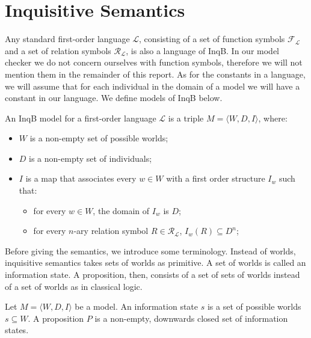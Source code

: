 \section{Inquisitive Semantics}\label{sec: InqB}
Any standard first-order language $\mathcal{L}$, consisting of a set of function symbols $\mathcal{F}_\mathcal{L}$ and a set of relation symbols $\mathcal{R}_\mathcal{L}$, is also a language of \textsf{InqB}. In our model checker we do not concern ourselves with function symbols, therefore we will not mention them in the remainder of this report. As for the constants in a language, we will assume that for each individual in the domain of a model we will have a constant in our language. We define models of \textsf{InqB} below.

\begin{defi}
An \textsf{InqB} model for a first-order language $\mathcal{L}$ is a triple $M=\langle W,D,I\rangle$, where:
\begin{itemize}
\setlength\itemsep{-0.3em}
    \item $W$ is a non-empty set of possible worlds;
    \item $D$ is a non-empty set of individuals;
    \item $I$ is a map that associates every $w\in W$ with a first order structure $I_w$ such that:
    \begin{itemize}
    \setlength\itemsep{-0.3em}
        \item for every $w\in W$, the domain of $I_w$ is $D$;
        \item for every $n$-ary relation symbol $R\in \mathcal{R}_{\mathcal{L}}$, $I_w(R)\subseteq D^n$;
    \end{itemize}
\end{itemize}
\end{defi}

Before giving the semantics, we introduce some terminology. Instead of worlds, inquisitive semantics takes sets of worlds as primitive. A set of worlds is called an information state. A proposition, then, consists of a set of sets of worlds instead of a set of worlds as in classical logic.

\begin{defi}
 Let $M=\langle W,D,I\rangle$ be a model. An information state $s$ is a set of possible worlds $s\subseteq W$. A proposition $P$ is a non-empty, downwards closed set of information states.
\end{defi}

